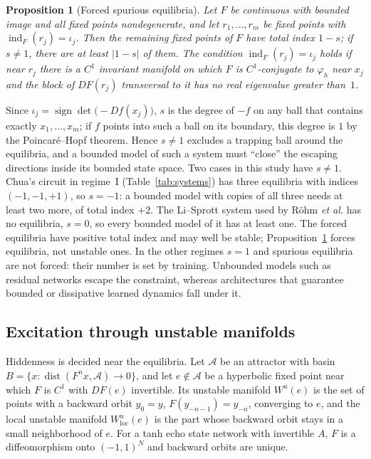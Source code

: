 \documentclass[aip,cha,reprint,amsmath,amssymb,longbibliography]{revtex4-2}
\newtheorem{proposition}{Proposition}
\theoremstyle{definition}
\newcommand{\ind}{\operatorname{ind}}
\begin{document}
\begin{proposition}[Forced spurious equilibria]
\label{prop:forced}
Let $F$ be continuous with bounded image and all fixed points nondegenerate, and let $r_1,\dots,r_m$ be fixed points with
$\ind_F(r_j)=\iota_j$. Then the remaining fixed points of $F$ have total index $1-s$; if $s\neq1$, there are at least $|1-s|$
of them. The condition $\ind_F(r_j)=\iota_j$ holds if near $r_j$ there is a $C^1$ invariant manifold on which $F$ is
$C^1$-conjugate to $\varphi_h$ near $x_j$ and the block of $DF(r_j)$ transversal to it has no real eigenvalue greater
than~$1$.
\end{proposition}

Since $\iota_j=\operatorname{sign}\det\bigl(-Df(x_j)\bigr)$, $s$ is the degree of $-f$ on any ball that contains exactly
$x_1,\dots,x_m$; if $f$ points into such a ball on its boundary, this degree is $1$ by the Poincar\'e--Hopf theorem. Hence
$s\neq1$ excludes a trapping ball around the equilibria, and a bounded model of such a system must ``close'' the escaping
directions inside its bounded state space. Two cases in this study have $s\neq1$. Chua's circuit in regime~I
(Table~\ref{tab:systems}) has three equilibria with indices $(-1,-1,+1)$, so $s=-1$: a bounded model with copies of all
three needs at least two more, of total index $+2$. The Li--Sprott system used by R\"ohm \textit{et al.}\cite{Rohm2021} has
no equilibria, $s=0$, so every bounded model of it has at least one. The forced equilibria have positive total index and
may well be stable; Proposition~\ref{prop:forced} forces equilibria, not unstable ones. In the other regimes $s=1$ and
spurious equilibria are not forced: their number is set by training. Unbounded models such as residual networks escape
the constraint, whereas architectures that guarantee bounded or dissipative learned
dynamics\cite{Kaptanoglu2021Trapping,Li2022Dissipative,Linot2023Stabilized,Tang2026Dissipative} fall under it.

\subsection{Excitation through unstable manifolds}
\label{sec:manifold}

Hiddenness is decided near the equilibria. Let $\mathcal{A}$ be an attractor with basin
$B=\{x:\operatorname{dist}(F^nx,\mathcal{A})\to0\}$, and let $e\notin\mathcal{A}$ be a hyperbolic fixed point near which $F$
is $C^1$ with $DF(e)$ invertible. Its unstable manifold $W^u(e)$ is the set of points with a backward orbit
$y_0=y$, $F(y_{-n-1})=y_{-n}$, converging to $e$, and the local unstable manifold $W^u_{\mathrm{loc}}(e)$ is the part whose
backward orbit stays in a small neighborhood of $e$. For a tanh echo state network with invertible $A$, $F$ is a
diffeomorphism onto $(-1,1)^N$ and backward orbits are unique.
\end{document}
